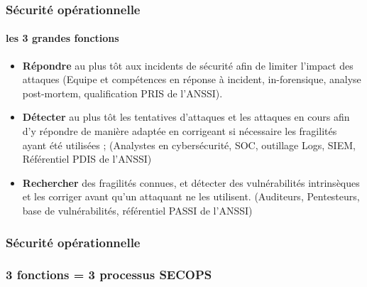 \begin{frame}
\frametitle<presentation>{Sécurité opérationnelle}
\framesubtitle<presentation>{les 3 grandes fonctions }
\begin{itemize}
  \item \textbf{Répondre} au plus tôt aux incidents de sécurité afin de limiter l'impact des attaques (Equipe et compétences en réponse à incident, in-forensique, analyse post-mortem, qualification PRIS de l'ANSSI).
  \item \textbf{Détecter} au plus tôt les tentatives d'attaques et les attaques en cours afin d'y répondre de manière adaptée en corrigeant si nécessaire les fragilités ayant été utilisées ; (Analystes en cybersécurité, SOC, outillage Logs, SIEM, Référentiel PDIS de l'ANSSI)
  \item \textbf{Rechercher} des fragilités connues, et  détecter des vulnérabilités intrinsèques  et les corriger avant qu'un attaquant ne les utilisent. (Auditeurs, Pentesteurs, base de vulnérabilités, référentiel PASSI de l'ANSSI)
\end{itemize}
\end{frame}



\begin{frame}
\frametitle<presentation>{Sécurité opérationnelle}
\end{frame}




\begin{frame}
\frametitle<presentation>{3 fonctions = 3 processus SECOPS}





\end{frame}


